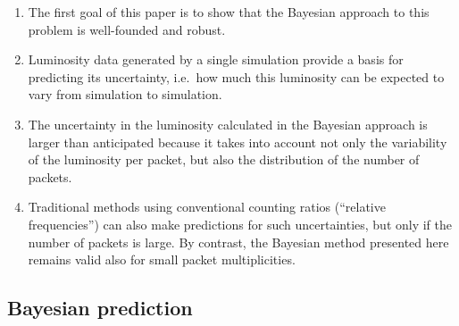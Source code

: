 \documentclass[11pt]{article}
\begin{document}
\begin{enumerate}
\item The first goal of this paper is to show that the Bayesian
  approach to this problem is well-founded and robust.

\item Luminosity data generated by a single simulation provide a
  basis for predicting its uncertainty, i.e.\ how much this luminosity
  can be expected to vary from simulation to simulation.

\item The uncertainty in the luminosity calculated in the Bayesian
  approach is larger than anticipated because it takes into account
  not only the variability of the luminosity per packet, but also the
  distribution of the number of packets.

\item Traditional methods using conventional counting ratios
  (``relative frequencies'') can also make predictions for such
  uncertainties, but only if the number of packets is large. By
  contrast, the Bayesian method presented here remains valid also for
  small packet multiplicities.

\end{enumerate}

\subsection{Bayesian prediction}
\label{sec:bayp}
\end{document}
